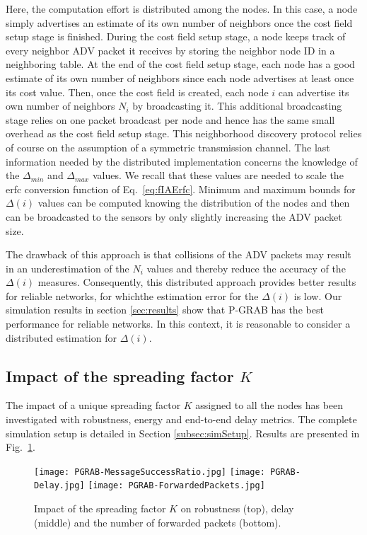 \documentclass[journal, peerreview, onecolumn, draftcls]{IEEEtran}
\begin{document}
Here, the computation effort is distributed among the nodes. In this case, a node simply advertises an estimate of its own number of neighbors once the cost field setup stage is finished. During the cost field setup stage, a node keeps track of every neighbor ADV packet it receives by storing the neighbor node ID in a neighboring table. At the end of the cost field setup stage, each node has a good estimate of its own number of neighbors since each node advertises at least once its cost value. Then, once the cost field is created, each node $i$ can advertise its own number of neighbors $N_i$ by broadcasting it. This additional broadcasting stage relies on one packet broadcast per node and hence has the same small overhead as the cost field setup stage. This neighborhood discovery protocol relies of course on the assumption of a symmetric transmission channel. The last information needed by the distributed implementation concerns the knowledge of the $\Delta_{min}$ and $\Delta_{max}$ values. We recall that these values are needed to scale the erfc conversion function of Eq.~\eqref{eq:fIAErfc}. Minimum and maximum bounds for $\Delta(i)$ values can be computed knowing the distribution of the nodes and then can be broadcasted to the sensors by only slightly increasing the ADV packet size.

The drawback of this approach is that collisions of the ADV packets may result in an underestimation of the $N_i$ values and thereby reduce the accuracy of the $\Delta(i)$ measures. Consequently, this distributed approach provides better results for reliable networks, for whichthe estimation error for the $\Delta(i)$ is low. Our simulation results in section \ref{sec:results} show that P-GRAB has the best performance for reliable networks. In this context, it is reasonable to consider a distributed estimation for $\Delta(i)$.

\subsection{Impact of the spreading factor $K$}\label{subsec:Kvalue-PGRAB}

The impact of a unique spreading factor $K$ assigned to all the nodes has been investigated with robustness, energy and end-to-end delay metrics. The complete simulation setup is detailed in Section \ref{subsec:simSetup}. Results are presented in Fig.~\ref{fig:resPGRABKParam}.


\begin{figure}
  \vspace{0.1in}
  \texttt{[image: PGRAB-MessageSuccessRatio.jpg]}
  \vspace{0.1in}
  \texttt{[image: PGRAB-Delay.jpg]}
  \vspace{0.1in}
  \texttt{[image: PGRAB-ForwardedPackets.jpg]}
  \caption{Impact of the spreading factor $K$ on robustness (top), delay (middle) and the number of forwarded packets (bottom).}
  \label{fig:resPGRABKParam}
\end{figure}
\end{document}
